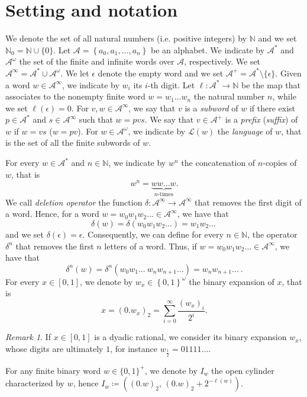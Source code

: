\documentclass[12pt]{article}
\theoremstyle{plain}\newtheorem{teo}{Theorem}
\theoremstyle{plain}\newtheorem{proposition}[teo]{Proposition}
\theoremstyle{plain}\newtheorem{lemma}[teo]{Lemma}
\theoremstyle{plain}\newtheorem{corollary}[teo]{Corollary}
\theoremstyle{plain}\newtheorem{conjecture}[teo]{Conjecture}
\theoremstyle{definition}\newtheorem{definition}[teo]{Definition}
\theoremstyle{remark}\newtheorem{remark}[teo]{Remark}
\theoremstyle{definition}\newtheorem{example}[teo]{Example}
\numberwithin{teo}{section}
\numberwithin{equation}{section}
\begin{document}
\section{Setting and notation}\label{sec:preliminaries}
We denote the set of all natural numbers (i.e.  positive integers) by $\mathbb{N}$ and we set $\mathbb{N}_0=\mathbb{N}\cup \{0\}$. 
Let $\mathcal{A} = \left\{a_0,a_1,\dots, a_{n}\right\}$ be an alphabet. We indicate
by $\mathcal{A}^{*}$ and $\mathcal{A}^\omega$
the set of the finite and infinite words over $\mathcal{A}$, respectively.  We set 
$\mathcal{A}^\infty = \mathcal{A}^* \cup \mathcal{A}^{\omega}$.
We let $\epsilon$ denote the empty word
and we set $\mathcal{A}^+ = \mathcal{A}^*\setminus\{\epsilon\}$.
Given a word $w \in \mathcal{A}^{\infty}$,
we indicate by $w_i$ its $i$-th digit.
Let $\ell\colon \mathcal{A}^* \to \mathbb{N}$ be the map that associates
to the nonempty finite word $w=w_1\dots w_n$ the natural number $n$,
while we set $\ell(\epsilon)=0$.
For $v, w \in \mathcal{A}^\infty$, we say that $v$ is a \textit{subword} of $w$ if there exist
$p \in \mathcal{A}^*$ and
$s \in \mathcal{A}^\infty$ 
such that $w = p v s$.
We say that $v \in \mathcal{A}^+$
is a \textit{prefix} (\textit{suffix}) of $w$
if $w = v s$ ($w = p v$).
For $w \in \mathcal{A}^{\omega}$,
we indicate by $\mathcal{L}(w)$ the \textit{language} of $w$,
that is the set  of all the finite subwords of $w$. 

For every $w \in \mathcal{A}^*$ and $n \in \mathbb{N}$,
we indicate by $w^n$ the concatenation of $n$-copies of $w$,
that is
\[
	w^n = \underbrace{w w \dots w}_{\text{$n$-times}}.
\]
We call \textit{deletion operator} the function $\delta\colon \mathcal{A}^\infty \to \mathcal{A}^\infty$ that removes the first digit of a word.
Hence, for a word $w = w_0 w_1 w_2   \ldots \in \mathcal{A}^{\infty}$, we have that
\[
	\delta(w) = \delta(w_0 w_1 w_2  \dots) = w_1 w_2 \dots \ 
\]
and we set $\delta(\epsilon) = \epsilon$.
Consequently,  we can define for every $n \in \mathbb{N}$,
the operator $\delta^n$ that removes the first $n$ letters of a word. Thus,  if $w = w_0 w_1 w_2   \ldots \in \mathcal{A}^{\infty}$, we have that
\[
	\delta^n(w)= 
	\delta^n(w_0 w_1 \dots\ w_n w_{n+1} \dots )
	= w_n w_{n+1} \dots \ .
\]
For every $x \in [0,1]$,  we denote by $w_x \in \left\{0,1\right\}^\omega$ the binary expansion of $x$, that is
\[
	x = (0.w_x)_2 = \sum_{i = 0}^{\infty}\frac{(w_x)_{i}}{2^i}.
\]
\begin{remark}
	If $x \in [0,1]$ is a dyadic rational,
	we consider its binary expansion $w_x$, whose digits are ultimately $1$,
	for instance $w_{\frac{1}{2}} = 01111\dots$.
\end{remark}
For any finite binary word $w\in\{0,1\}^+$,
we denote by $I_w$ the open cylinder characterized
by $w$, hence
$ I_w \coloneqq \left((0.w)_2,\, (0.w)_2 + 2^{-\ell(w)}\right) $.
\end{document}
